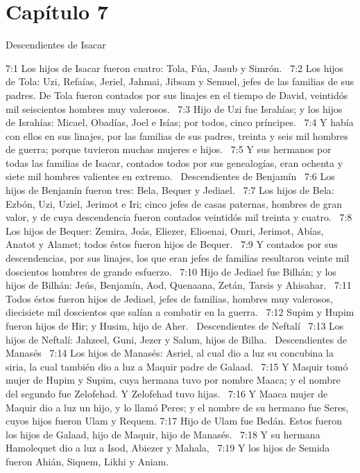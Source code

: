\section*{Capítulo 7 }
Descendientes de Isacar  

7:1 Los hijos de Isacar fueron cuatro: Tola, Fúa, Jasub y Simrón.  
7:2 Los hijos de Tola: Uzi, Refaías, Jeriel, Jahmai, Jibsam y Semuel, jefes de las familias de sus padres. De Tola fueron contados por sus linajes en el tiempo de David, veintidós mil seiscientos hombres muy valerosos.  
7:3 Hijo de Uzi fue Israhías; y los hijos de Israhías: Micael, Obadías, Joel e Isías; por todos, cinco príncipes.  
7:4 Y había con ellos en sus linajes, por las familias de sus padres, treinta y seis mil hombres de guerra; porque tuvieron muchas mujeres e hijos.  
7:5 Y sus hermanos por todas las familias de Isacar, contados todos por sus genealogías, eran ochenta y siete mil hombres valientes en extremo.  
Descendientes de Benjamín  
7:6 Los hijos de Benjamín fueron tres: Bela, Bequer y Jediael.  
7:7 Los hijos de Bela: Ezbón, Uzi, Uziel, Jerimot e Iri; cinco jefes de casas paternas, hombres de gran valor, y de cuya descendencia fueron contados veintidós mil treinta y cuatro.  
7:8 Los hijos de Bequer: Zemira, Joás, Eliezer, Elioenai, Omri, Jerimot, Abías, Anatot y Alamet; todos éstos fueron hijos de Bequer.  
7:9 Y contados por sus descendencias, por sus linajes, los que eran jefes de familias resultaron veinte mil doscientos hombres de grande esfuerzo.  
7:10 Hijo de Jediael fue Bilhán; y los hijos de Bilhán: Jeús, Benjamín, Aod, Quenaana, Zetán, Tarsis y Ahisahar.  
7:11 Todos éstos fueron hijos de Jediael, jefes de familias, hombres muy valerosos, diecisiete mil doscientos que salían a combatir en la guerra.  
7:12 Supim y Hupim fueron hijos de Hir; y Husim, hijo de Aher.  
Descendientes de Neftalí  
7:13 Los hijos de Neftalí: Jahzeel, Guni, Jezer y Salum, hijos de Bilha.  
Descendientes de Manasés  
7:14 Los hijos de Manasés: Asriel, al cual dio a luz su concubina la siria, la cual también dio a luz a Maquir padre de Galaad.  
7:15 Y Maquir tomó mujer de Hupim y Supim, cuya hermana tuvo por nombre Maaca; y el nombre del segundo fue Zelofehad. Y Zelofehad tuvo hijas.  
7:16 Y Maaca mujer de Maquir dio a luz un hijo, y lo llamó Peres; y el nombre de su hermano fue Seres, cuyos hijos fueron Ulam y Requem. 
7:17 Hijo de Ulam fue Bedán. Estos fueron los hijos de Galaad, hijo de Maquir, hijo de Manasés.  
7:18 Y su hermana Hamolequet dio a luz a Isod, Abiezer y Mahala,  
7:19 Y los hijos de Semida fueron Ahián, Siquem, Likhi y Aniam.  
